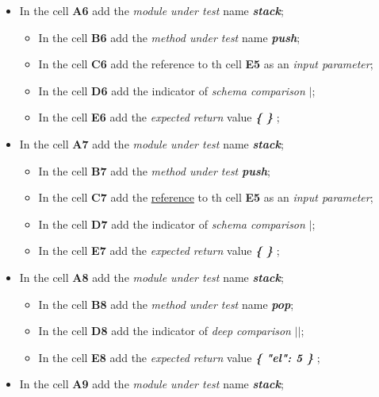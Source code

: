 \begin{itemize}
\begin{itemize}
	\end{itemize}
%	
	\item In the cell \textbf{A6} add the \textit{module under test} name\textit{ \textbf{stack}};
	\begin{itemize}
		\item In the cell \textbf{B6} add the \textit{method under test} name\textit{ \textbf{push}};
		\item In the cell \textbf{C6} add the reference to th cell \textbf{E5} as an \textit{ input parameter};
		\item In the cell \textbf{D6} add the indicator of \textit{schema comparison}\textit{\textbf{ $|$}};
		\item In the cell \textbf{E6} add the \textit{expected return} value\textit{ \textbf{ \{ \} }};
	\end{itemize}
%	
	\item In the cell \textbf{A7} add the \textit{module under test} name\textit{\textbf{ stack}};
	\begin{itemize}
		\item In the cell \textbf{B7} add the \textit{method under test} \textit{\textbf{push}};
		\item In the cell \textbf{C7} add the \underline{reference} to th cell \textbf{E5} as an\textit{ input parameter};
		\item In the cell \textbf{D7} add the indicator of \textit{schema comparison} \textit{\textbf{$|$}};
		\item In the cell \textbf{E7} add the \textit{expected return} value\textit{ \textbf{ \{ \} }};
	\end{itemize}
%	
	\item In the cell \textbf{A8} add the \textit{module under test} name\textit{ \textbf{stack}};
	\begin{itemize}
		\item In the cell \textbf{B8} add the \textit{method under test} name \textit{\textbf{pop}};
		\item In the cell \textbf{D8} add the indicator of \textit{deep comparison} \textit{\textbf{$||$}};
		\item In the cell \textbf{E8} add the \textit{expected return} value\textit{ \textbf{ \{ "el": 5 \} }};
	\end{itemize}
%	
	\item In the cell \textbf{A9} add the \textit{module under test} name\textit{ \textbf{stack}};

\end{itemize}
